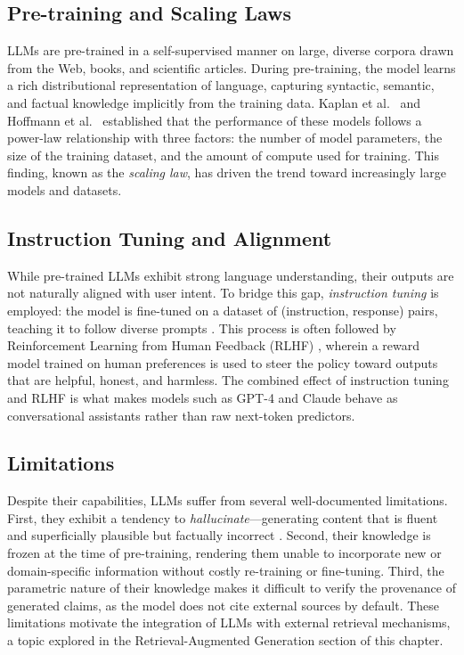 \subsection{Pre-training and Scaling Laws}

LLMs are pre-trained in a self-supervised manner on large, diverse corpora drawn from the Web, books, and scientific articles. During pre-training, the model learns a rich distributional representation of language, capturing syntactic, semantic, and factual knowledge implicitly from the training data. Kaplan et al.\ \cite{kaplan2020scaling} and Hoffmann et al.\ \cite{hoffmann2022training} established that the performance of these models follows a power-law relationship with three factors: the number of model parameters, the size of the training dataset, and the amount of compute used for training. This finding, known as the \emph{scaling law}, has driven the trend toward increasingly large models and datasets.

\subsection{Instruction Tuning and Alignment}

While pre-trained LLMs exhibit strong language understanding, their outputs are not naturally aligned with user intent. To bridge this gap, \emph{instruction tuning} is employed: the model is fine-tuned on a dataset of (instruction, response) pairs, teaching it to follow diverse prompts \cite{ouyang2022training}. This process is often followed by Reinforcement Learning from Human Feedback (RLHF) \cite{ziegler2019fine, lambert2024illustrating}, wherein a reward model trained on human preferences is used to steer the policy toward outputs that are helpful, honest, and harmless. The combined effect of instruction tuning and RLHF is what makes models such as GPT-4 and Claude behave as conversational assistants rather than raw next-token predictors.

\subsection{Limitations}

Despite their capabilities, LLMs suffer from several well-documented limitations. First, they exhibit a tendency to \emph{hallucinate}---generating content that is fluent and superficially plausible but factually incorrect \cite{ji2023survey, huang2023survey}. Second, their knowledge is frozen at the time of pre-training, rendering them unable to incorporate new or domain-specific information without costly re-training or fine-tuning. Third, the parametric nature of their knowledge makes it difficult to verify the provenance of generated claims, as the model does not cite external sources by default. These limitations motivate the integration of LLMs with external retrieval mechanisms, a topic explored in the Retrieval-Augmented Generation section of this chapter.

